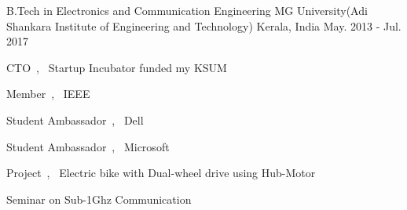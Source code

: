 

\begin{cventries}

  \cventry
    {B.Tech in Electronics and Communication Engineering} %
    {MG University(Adi Shankara Institute of Engineering and Technology)} %
    {Kerala, India} %
    {May. 2013 - Jul. 2017} %
    {
      \begin{cvitems} %
        \item {CTO~,~ Startup Incubator funded my KSUM}
        \item {Member~,~ IEEE}
        \item {Student Ambassador~,~ Dell}
        \item {Student Ambassador~,~ Microsoft}
        \item {Project~,~ Electric bike with Dual-wheel drive using Hub-Motor } 
        \item {Seminar on Sub-1Ghz Communication}  
    \end{cvitems}
    }

\end{cventries}

